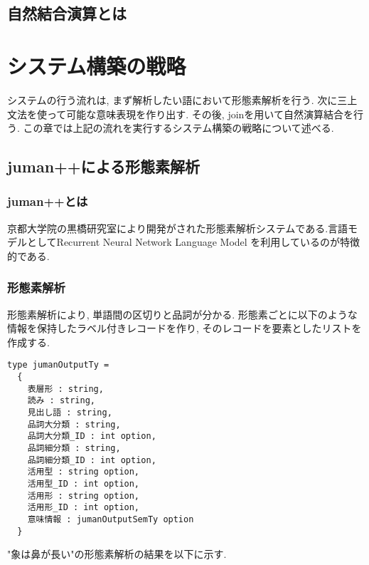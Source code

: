 \documentclass{jreport}
\begin{document}
\section{自然結合演算とは}





\chapter{システム構築の戦略}
システムの行う流れは, まず解析したい語において形態素解析を行う. 次に三上文法を使って可能な意味表現を作り出す. 
その後, joinを用いて自然演算結合を行う.
この章では上記の流れを実行するシステム構築の戦略について述べる.
 
\section{juman++による形態素解析}
\subsection{juman++とは}
京都大学院の黒橋研究室により開発がされた形態素解析システムである.言語モデルとしてRecurrent Neural Network Language Model
を利用しているのが特徴的である.
\subsection{形態素解析}
形態素解析により, 単語間の区切りと品詞が分かる. 形態素ごとに以下のような情報を保持したラベル付きレコードを作り, 
そのレコードを要素としたリストを作成する.

\begin{verbatim}
type jumanOutputTy = 
  {
    表層形 : string, 
    読み : string,
    見出し語 : string,
    品詞大分類 : string,
    品詞大分類_ID : int option,
    品詞細分類 : string,
    品詞細分類_ID : int option, 
    活用型 : string option,
    活用型_ID : int option,
    活用形 : string option,
    活用形_ID : int option,
    意味情報 : jumanOutputSemTy option
  }
\end{verbatim}

"象は鼻が長い"の形態素解析の結果を以下に示す.
\end{document}

